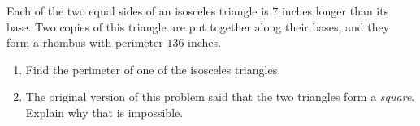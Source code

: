Each of the two equal sides of an isosceles triangle is $7$ inches longer than its base. Two copies of this triangle are put together along their bases, and they form a rhombus with perimeter $136$ inches.
\begin{enumerate}
\item[(a)] Find the perimeter of one of the isosceles triangles.
\item[(b)] The original version of this problem said that the two triangles form a \emph{square}. Explain why that is impossible.
\end{enumerate}
